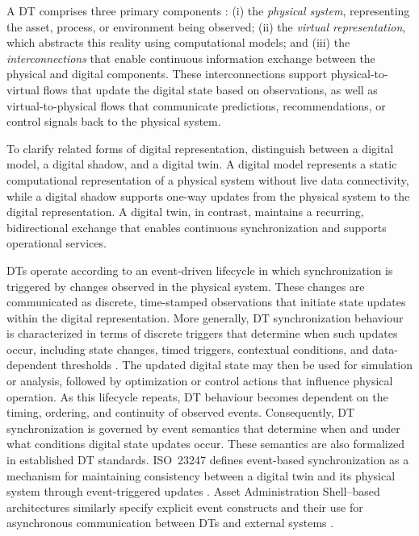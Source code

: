 A DT comprises three primary components \cite{vanderhorn2021digital}:
(i) the \emph{physical system}, representing the asset, process, or
environment being observed; (ii) the \emph{virtual representation},
which abstracts this reality using computational models; and (iii) the
\emph{interconnections} that enable continuous information exchange
between the physical and digital components. These interconnections support physical-to-virtual flows that update the digital state based on observations, as well as virtual-to-physical flows that communicate predictions, recommendations, or control signals back to the physical system.

To clarify related forms of digital representation, \citet{kritzinger2018digital} distinguish between a digital model, a digital shadow, and a digital twin. A digital model represents a static computational representation of a physical system without live data connectivity, while a digital shadow supports one-way updates from the physical system to the digital representation. A digital twin, in contrast, maintains a recurring, bidirectional exchange that enables continuous synchronization and supports operational services.

DTs operate according to an event-driven lifecycle in which synchronization is triggered by changes observed in the physical system. These changes are communicated as discrete, time-stamped observations that initiate state updates within the digital representation. More generally, DT synchronization behaviour is characterized in terms of discrete triggers that determine when such updates occur, including state changes, timed triggers, contextual conditions, and data-dependent thresholds \cite{alghamdi2024synchronization}. The updated digital state may then be used for simulation or analysis, followed by optimization or control actions that influence physical operation. As this lifecycle repeats, DT behaviour becomes dependent on the timing, ordering, and continuity of observed events. Consequently, DT synchronization is governed by event semantics that determine when and under what conditions digital state updates occur. These semantics are also formalized in established DT standards. ISO~23247 defines event-based synchronization as a mechanism for maintaining consistency between a digital twin and its physical system through event-triggered updates \cite{iso23247_1_2021}. Asset Administration Shell–based architectures similarly specify explicit event constructs and their use for asynchronous communication between DTs and external systems \cite{aas_details_2018_p1}.


